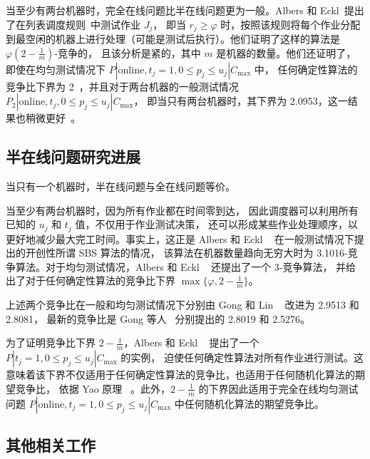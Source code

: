 当至少有两台机器时，完全在线问题比半在线问题更为一般。Albers 和 Eckl~\cite{albers2021scheduling}提出了在列表调度规则~\cite{graham1966bounds}中测试作业 \( J_j \)，
即当 \( r_j \geq \varphi \) 时，按照该规则将每个作业分配到最空闲的机器上进行处理（可能是测试后执行）。他们证明了这样的算法是 \( \varphi(2 - \frac{1}{m}) \)-竞争的，
且该分析是紧的，其中 \( m \) 是机器的数量。他们还证明了，即使在均匀测试情况下 \( P | \text{online}, t_j = 1, 0 \leq p_j \leq u_j | C_{\text{max}} \) 中，
任何确定性算法的竞争比下界为 2~\cite{albers2021scheduling}，并且对于两台机器的一般测试情况 \( P_2 | \text{online}, t_j, 0 \leq p_j \leq u_j | C_{\text{max}} \)，
即当只有两台机器时，其下界为 2.0953，这一结果也稍微更好~\cite{albers2021scheduling}。

\subsection{半在线问题研究进展}

当只有一个机器时，半在线问题与全在线问题等价。

当至少有两台机器时，因为所有作业都在时间零到达，
因此调度器可以利用所有已知的 \( u_j \) 和 \( t_j \) 值，不仅用于作业测试决策，
还可以形成某些作业处理顺序，以更好地减少最大完工时间。事实上，这正是 Albers 和 Eckl ~\cite{albers2021scheduling} 在一般测试情况下提出的开创性所谓 SBS 算法的情况，
该算法在机器数量趋向无穷大时为 3.1016-竞争算法。对于均匀测试情况，Albers 和 Eckl ~\cite{albers2021scheduling} 还提出了一个 3-竞争算法，
并给出了对于任何确定性算法的竞争比下界 \( \max\{\varphi, 2 - \frac{1}{m}\} \)。

上述两个竞争比在一般和均匀测试情况下分别由 Gong 和 Lin ~\cite{gong2021improved} 改进为 2.9513 和 2.8081，
最新的竞争比是 Gong 等人~\cite{gong2023randomized} 分别提出的 2.8019 和 2.5276。

为了证明竞争比下界 \( 2 - \frac{1}{m} \)，Albers 和 Eckl ~\cite{albers2021scheduling} 提出了一个 \( P | t_j = 1, 0 \leq p_j \leq u_j | C_{\text{max}} \) 的实例，
迫使任何确定性算法对所有作业进行测试。这意味着该下界不仅适用于任何确定性算法的竞争比，也适用于任何随机化算法的期望竞争比，
依据 Yao 原理 ~\cite{yao1977probabilistic}。此外，\( 2 - \frac{1}{m} \) 的下界因此适用于完全在线均匀测试问题 \( P | \text{online}, t_j = 1, 0 \leq p_j \leq u_j | C_{\text{max}} \) 中任何随机化算法的期望竞争比。

\subsection{其他相关工作}

